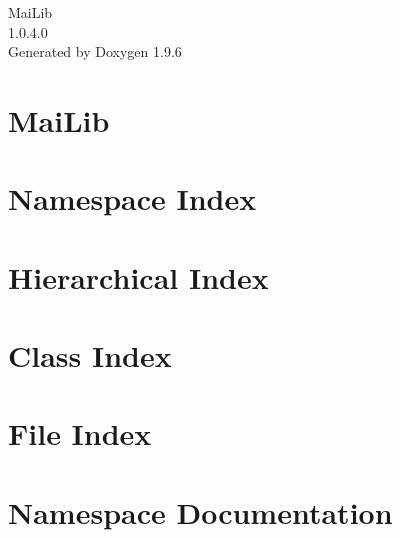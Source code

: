 \documentclass[twoside]{book}
\newcommand{\+}{\discretionary{\mbox{\scriptsize$\hookleftarrow$}}{}{}}
\newcommand{\clearemptydoublepage}{%
    \newpage{\pagestyle{empty}\cleardoublepage}%
  }
\begin{document}
  \raggedbottom
    \hypersetup{pageanchor=false,
                bookmarksnumbered=true,
                pdfencoding=unicode
               }
  \begin{titlepage}
  \vspace*{7cm}
  \begin{center}%
  {\Large Mai\+Lib}\\
  [1ex]\large 1.\+0.\+4.\+0 \\
  \vspace*{1cm}
  {\large Generated by Doxygen 1.9.6}\\
  \end{center}
  \end{titlepage}
  \clearemptydoublepage
  \tableofcontents
  \clearemptydoublepage
  \hypersetup{pageanchor=true}
\chapter{Mai\+Lib}
\label{md__neskol__mai_lib__r_e_a_d_m_e}

\chapter{Namespace Index}

\chapter{Hierarchical Index}

\chapter{Class Index}

\chapter{File Index}

\chapter{Namespace Documentation}

\end{document}
